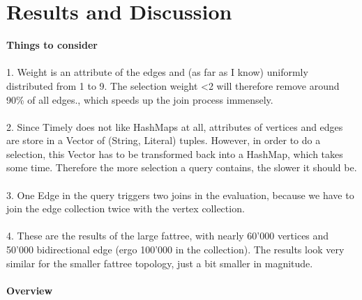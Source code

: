 \documentclass[11pt,singlecolumn]{scrartcl}
\begin{document}
\section{Results and Discussion}
\textbf{Things to consider}\\\\
1. Weight is an attribute of the edges and (as far as I know) uniformly distributed from 1 to 9. The selection weight \textless 2 will therefore remove around 90\% of all edges., which speeds up the join process immensely.\\\\
2. Since Timely does not like HashMaps at all, attributes of vertices and edges are store in a Vector of (String, Literal) tuples. However, in order to do a selection, this Vector has to be transformed back into a HashMap, which takes some time. Therefore  the more selection a query contains, the slower it should be.\\\\
3. One Edge in the query triggers two joins in the evaluation,  because we have to join the edge collection twice with the vertex collection.\\\\
4. These are the results of the large fattree, with nearly 60'000 vertices and 50'000 bidirectional edge (ergo 100'000 in the collection). The results look very similar for the smaller fattree topology, just a bit smaller in magnitude.\\\\
\textbf{Overview}
\end{document}

